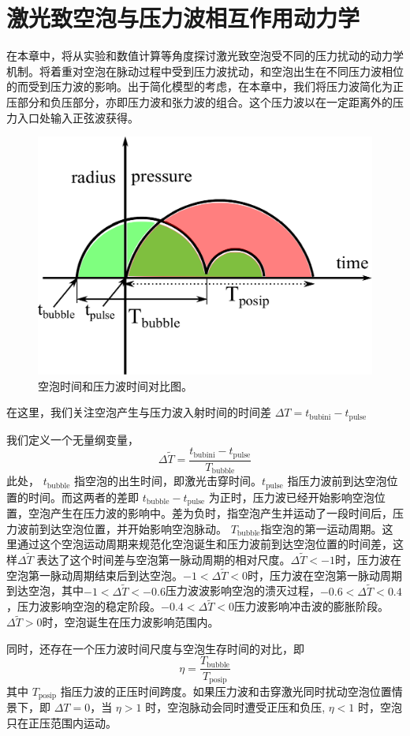 \chapter{激光致空泡与压力波相互作用动力学}\label{chapter5}

在本章中，将从实验和数值计算等角度探讨激光致空泡受不同的压力扰动的动力学机制。将着重对空泡在脉动过程中受到压力波扰动，和空泡出生在不同压力波相位的而受到压力波的影响。出于简化模型的考虑，在本章中，我们将压力波简化为正压部分和负压部分，亦即压力波和张力波的组合。这个压力波以在一定距离外的压力入口处输入正弦波获得。
\begin{figure}[H]
  \centering
  \includegraphics[width=0.5\linewidth]{img/fig5.1-eps-converted-to.pdf}
  \caption{空泡时间和压力波时间对比图。}
  \label{fig:5.1}
\end{figure}



在这里，我们关注空泡产生与压力波入射时间的时间差
$\Delta T =t_{\text{bubini}}-t_{\text{pulse}}$

我们定义一个无量纲变量，
$$\Delta \tilde{T} =\frac{t_{\text{bubini}}-t_{\text{pulse}}}{T_{\text{bubble}}}$$
此处， $t_{\text{bubble}}$
指空泡的出生时间，即激光击穿时间。$t_{\text{pulse}}$
指压力波前到达空泡位置的时间。而这两者的差即
$t_{\text{bubble}}-t_{\text{pulse}}$
为正时，压力波已经开始影响空泡位置，空泡产生在压力波的影响中。差为负时，指空泡产生并运动了一段时间后，压力波前到达空泡位置，并开始影响空泡脉动。
$T_{\text{bubble}}$指空泡的第一运动周期。这里通过这个空泡运动周期来规范化空泡诞生和压力波前到达空泡位置的时间差，这样$\Delta \tilde{T}$
表达了这个时间差与空泡第一脉动周期的相对尺度。$\Delta \tilde{T}<-1$时，压力波在空泡第一脉动周期结束后到达空泡。$-1<\Delta \tilde{T}<0$时，压力波在空泡第一脉动周期到达空泡，其中$-1<\Delta \tilde{T}<-0.6$压力波波影响空泡的溃灭过程，$-0.6<\Delta \tilde{T}<0.4$，压力波影响空泡的稳定阶段。$-0.4<\Delta \tilde{T}<0$压力波影响冲击波的膨胀阶段。$\Delta \tilde{T}>0$时，空泡诞生在压力波影响范围内。

同时，还存在一个压力波时间尺度与空泡生存时间的对比，即
$$\eta=\frac {T_\mathrm{bubble}}{T_\mathrm{posip}}$$ 其中
$T_\mathrm{posip}$
指压力波的正压时间跨度。如果压力波和击穿激光同时扰动空泡位置情景下，即
$\Delta T=0$，当 $\eta>1$ 时，空泡脉动会同时遭受正压和负压,
$\eta<1$ 时，空泡只在正压范围内运动。

